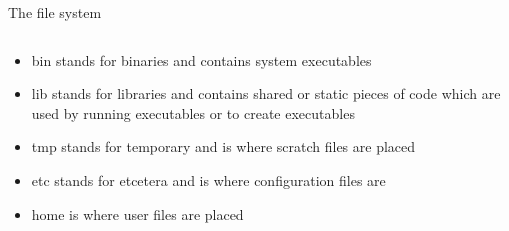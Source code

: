 \documentclass[unknownkeysallowed, 10pt, a4 paper, handout]{beamer}
\begin{document}
\begin{frame}[label=filesystem]{The file system}
\begin{columns}[T]
\begin{column}{.73\textwidth}
{\begin{itemize}
        \item bin stands for binaries and contains system executables
        \item lib stands for libraries and contains shared or static pieces of
          code which are used by running executables or to create executables
        \item tmp stands for temporary and is where scratch files are placed
        \item etc stands for etcetera and is where configuration files are
        \item home is where user files are placed
      \end{itemize}
    }
    \end{column}
  \end{columns}
\end{frame}
\end{document}
